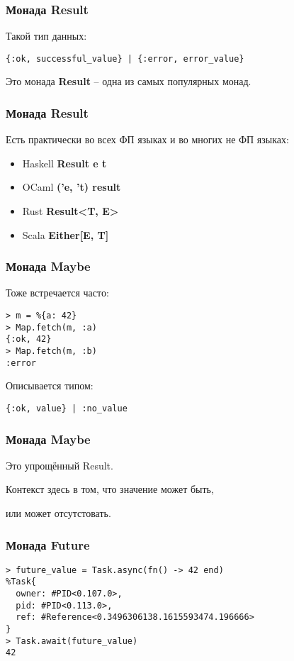 \documentclass[10pt]{beamer}
\begin{document}
\begin{frame}[fragile]
  \frametitle{Монада Result}
  Такой тип данных:
  \par \bigskip
  \begin{lstlisting}
{:ok, successful_value} | {:error, error_value}
  \end{lstlisting}
  \par \bigskip
  Это монада \textbf{Result} -- одна из самых популярных монад.
\end{frame}

\begin{frame}[fragile]
  \frametitle{Монада Result}
  Есть практически во всех ФП языках и во многих не ФП языках:
  \begin{itemize}
  \item Haskell \textbf{Result e t}
  \item OCaml \textbf{('e, 't) result}
  \item Rust \textbf{Result<T, E>}
  \item Scala \textbf{Either[E, T]}
  \end{itemize}
\end{frame}

\begin{frame}[fragile]
  \frametitle{Монада Maybe}
  Тоже встречается часто:
  \begin{lstlisting}
> m = %{a: 42}
> Map.fetch(m, :a)
{:ok, 42}
> Map.fetch(m, :b)
:error
  \end{lstlisting}
  \par \bigskip
  Описывается типом:
  \begin{lstlisting}
{:ok, value} | :no_value
  \end{lstlisting}
\end{frame}

\begin{frame}
  \frametitle{Монада Maybe}
  Это упрощённый Result. 
  \par \bigskip
  Контекст здесь в том, что значение может быть,
  \par \bigskip
  или может отсутстовать.
\end{frame}

\begin{frame}[fragile]
  \frametitle{Монада Future}
  \begin{lstlisting}
> future_value = Task.async(fn() -> 42 end)
%Task{
  owner: #PID<0.107.0>,
  pid: #PID<0.113.0>,
  ref: #Reference<0.3496306138.1615593474.196666>
}
> Task.await(future_value)
42
  \end{lstlisting}
\end{frame}
\end{document}
